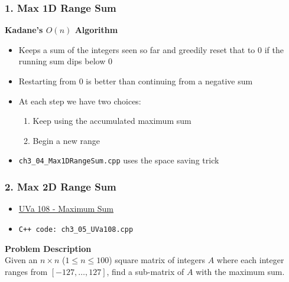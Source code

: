 \documentclass{beamer}
\begin{document}
\begin{frame}[fragile]
\frametitle{1. Max 1D Range Sum}

\color{red}\textbf{Kadane's $O(n)$ Algorithm}\color{black} \\

\begin{itemize}
    \item Keeps a sum of the integers seen so far and greedily reset that to $0$ if the running sum dips below $0$
    \item Restarting from $0$ is better than continuing from a negative sum
    \item At each step we have two choices:
    	\begin{enumerate}
		    \item Keep using the accumulated maximum sum
		    \item Begin a new range
		\end{enumerate}
	\item \verb|ch3_04_Max1DRangeSum.cpp| uses the space saving trick
\end{itemize}


\end{frame}

\begin{frame}[fragile]
\frametitle{2. Max 2D Range Sum}

\begin{itemize}
    \item \href{https://onlinejudge.org/index.php?option=com_onlinejudge&Itemid=8&category=3&page=show_problem&problem=44}{UVa 108 - Maximum Sum}
    \item \color{red}\verb|C++ code: ch3_05_UVa108.cpp|\color{black}
\end{itemize}

\vspace{0.3cm}

\color{red}\textbf{Problem Description}\color{black} \\

Given an $n \times n$ ($1 \leq n \le 100$) square matrix of integers $A$ where each integer ranges from $[-127,\ldots,127]$, find a sub-matrix of $A$ with the maximum sum. 

\end{frame}
\end{document}
